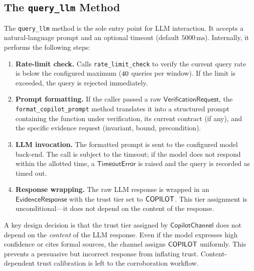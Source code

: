\documentclass[11pt]{article}
\newcommand{\CopCh}{\mathsf{CopilotChannel}}
\newcommand{\queryLLM}{\texttt{query\_llm}}
\newcommand{\rateCheck}{\texttt{rate\_limit\_check}}
\newcommand{\fmtPrompt}{\texttt{format\_copilot\_prompt}}
\begin{document}
\subsection{The \texorpdfstring{\queryLLM}{query\_llm} Method}
\label{sec:copilot:queryllm}

The \queryLLM{} method is the sole entry point for LLM interaction.
It accepts a natural-language prompt and an optional timeout
(default $5000\,\text{ms}$).  Internally, it performs the
following steps:

\begin{enumerate}
\item \textbf{Rate-limit check.}
  Calls \rateCheck{} to verify the current query rate is below the
  configured maximum ($40$ queries per
  \ppLXXXVIIIrateLimitWindow{} window).  If the limit is exceeded,
  the query is rejected immediately.

\item \textbf{Prompt formatting.}
  If the caller passed a raw $\mathsf{VerificationRequest}$, the
  \fmtPrompt{} method translates it into a structured prompt
  containing the function under verification, its current contract
  (if any), and the specific evidence request (invariant, bound,
  precondition).

\item \textbf{LLM invocation.}
  The formatted prompt is sent to the configured model back-end.
  The call is subject to the timeout; if the model does not respond
  within the allotted time, a $\mathsf{TimeoutError}$ is raised
  and the query is recorded as timed out.

\item \textbf{Response wrapping.}
  The raw LLM response is wrapped in an $\mathsf{EvidenceResponse}$
  with the trust tier set to $\mathsf{COPILOT}$.  This tier assignment is
  unconditional---it does not depend on the content of the response.
\end{enumerate}

\begin{remark}
\label{rem:content-independent}
A key design decision is that the trust tier assigned by $\CopCh$
does not depend on the \emph{content} of the LLM response.
Even if the model expresses high confidence or cites formal
sources, the channel assigns $\mathsf{COPILOT}$ uniformly.  This prevents
a persuasive but incorrect response from inflating trust.
Content-dependent trust calibration is left to the corroboration
workflow.
\end{remark}
\end{document}
